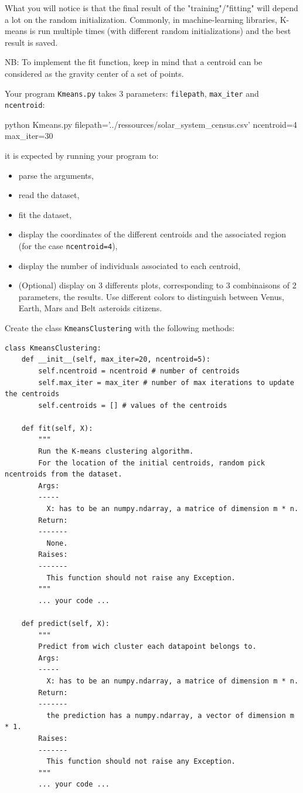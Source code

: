 \documentclass{42-en}
\begin{document}
What you will notice is that the final result of the "training"/"fitting" will depend a lot on the random initialization.
Commonly, in machine-learning libraries, K-means is run multiple times
(with different random initializations) and the best result is saved.  


NB: To implement the fit function, keep in mind that a centroid can be considered as the gravity center of a set of points.  

Your program \texttt{Kmeans.py} takes 3 parameters: \texttt{filepath}, \texttt{max\_iter} and \texttt{ncentroid}:

\begin{42console}
  python Kmeans.py filepath='../ressources/solar_system_census.csv' ncentroid=4 max_iter=30
\end{42console}


it is expected by running your program to:
\begin{itemize}
  \item parse the arguments,
  \item read the dataset,
  \item fit the dataset,
  \item display the coordinates of the different centroids and the associated region (for the case \texttt{ncentroid=4}),
  \item display the number of individuals associated to each centroid,
  \item (Optional) display on 3 differents plots, corresponding to 3 combinaisons of 2 parameters,
    the results. Use different colors to distinguish  between Venus, Earth, Mars and Belt asteroids citizens.
\end{itemize}

Create the class \texttt{KmeansClustering} with the following methods:  

\begin{verbatim}
class KmeansClustering:
    def __init__(self, max_iter=20, ncentroid=5):
        self.ncentroid = ncentroid # number of centroids
        self.max_iter = max_iter # number of max iterations to update the centroids
        self.centroids = [] # values of the centroids
        
    def fit(self, X):
        """
        Run the K-means clustering algorithm.
        For the location of the initial centroids, random pick ncentroids from the dataset.
        Args:
        -----
          X: has to be an numpy.ndarray, a matrice of dimension m * n.
        Return:
        -------
          None.
        Raises:
        -------
          This function should not raise any Exception.
        """
        ... your code ...

    def predict(self, X):
        """
        Predict from wich cluster each datapoint belongs to.
        Args:
        -----
          X: has to be an numpy.ndarray, a matrice of dimension m * n.
        Return:
        -------
          the prediction has a numpy.ndarray, a vector of dimension m * 1.
        Raises:
        -------
          This function should not raise any Exception.
        """
        ... your code ...
\end{verbatim}
\end{document}
